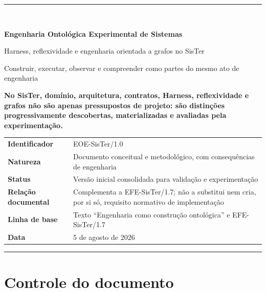 \documentclass[11pt,a4paper,oneside]{article}
\begin{document}
\begin{titlepage}
\pagestyle{empty}
\thispagestyle{empty}
\vspace*{2.0cm}
{\color{sisterblue}\rule{\textwidth}{1.2pt}}\\[1.15cm]
{\Huge\bfseries Engenharia Ontológica Experimental de Sistemas\par}
\vspace{0.45cm}
{\Large Harness, reflexividade e engenharia orientada a grafos no SisTer\par}
\vspace{0.25cm}
{\large Construir, executar, observar e compreender como partes do mesmo ato de engenharia\par}
\vspace{1.15cm}
\begin{principio}
\centering\Large
\textbf{No SisTer, domínio, arquitetura, contratos, Harness, reflexividade e grafos não são apenas pressupostos de projeto: são distinções progressivamente descobertas, materializadas e avaliadas pela experimentação.}
\end{principio}
\vfill
\begin{tabularx}{\textwidth}{P{4.3cm}Y}
\toprule
\textbf{Identificador} & EOE-SisTer/1.0 \\
\textbf{Natureza} & Documento conceitual e metodológico, com consequências de engenharia \\
\textbf{Status} & Versão inicial consolidada para validação e experimentação \\
\textbf{Relação documental} & Complementa a EFE-SisTer/1.7; não a substitui nem cria, por si só, requisito normativo de implementação \\
\textbf{Linha de base} & Texto ``Engenharia como construção ontológica'' e EFE-SisTer/1.7 \\
\textbf{Data} & 5 de agosto de 2026 \\
\bottomrule
\end{tabularx}
\vspace{1.15cm}
{\color{sisterblue}\rule{\textwidth}{1.2pt}}
\end{titlepage}
\pagestyle{fancy}

\section*{Controle do documento}
\end{document}
